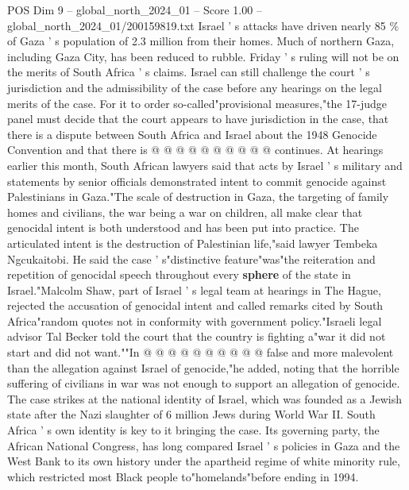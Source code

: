 \begin{textsample}{POS Dim 9 – global\_north\_2024\_01 – Score 1.00 – global\_north\_2024\_01/200159819.txt}
Israel ' s attacks have driven nearly 85 \% of Gaza ' s population of 2.3 million from their homes.
Much of northern Gaza, including Gaza City, has been reduced to rubble.
Friday ' s ruling will not be on the merits of South Africa ' s claims.
Israel can still challenge the court ' s jurisdiction and the admissibility of the case before any hearings on the legal merits of the case.
For it to order so-called"provisional measures,"the 17-judge panel must decide that the court appears to have jurisdiction in the case, that there is a dispute between South Africa and Israel about the 1948 Genocide Convention and that there is @ @ @ @ @ @ @ @ @ @ continues.
At hearings earlier this month, South African lawyers said that acts by Israel ' s military and statements by senior officials demonstrated intent to commit genocide against Palestinians in Gaza."The scale of destruction in Gaza, the targeting of family homes and civilians, the war being a war on children, all make clear that genocidal intent is both understood and has been put into practice.
The articulated intent is the destruction of Palestinian life,"said lawyer Tembeka Ngcukaitobi.
He said the case ' s"distinctive feature"was"the reiteration and repetition of genocidal speech throughout every \textbf{sphere} of the state in Israel."Malcolm Shaw, part of Israel ' s legal team at hearings in The Hague, rejected the accusation of genocidal intent and called remarks cited by South Africa"random quotes not in conformity with government policy."Israeli legal advisor Tal Becker told the court that the country is fighting a"war it did not start and did not want.""In @ @ @ @ @ @ @ @ @ @ false and more malevolent than the allegation against Israel of genocide,"he added, noting that the horrible suffering of civilians in war was not enough to support an allegation of genocide.
The case strikes at the national identity of Israel, which was founded as a Jewish state after the Nazi slaughter of 6 million Jews during World War II.
South Africa ' s own identity is key to it bringing the case.
Its governing party, the African National Congress, has long compared Israel ' s policies in Gaza and the West Bank to its own history under the apartheid regime of white minority rule, which restricted most Black people to"homelands"before ending in 1994.

\end{textsample}
